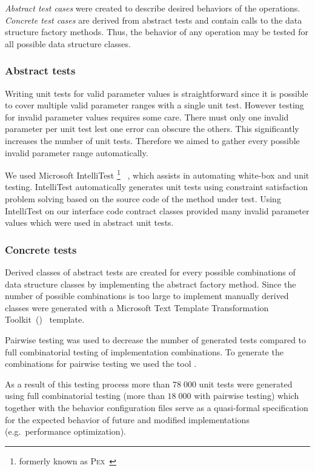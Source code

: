 \emph{Abstract test cases} were created to describe desired behaviors
of the operations. \emph{Concrete test cases} are derived from
abstract tests and contain calls to the data structure factory
methods. Thus, the behavior of any operation may be tested for all
possible data structure classes.

\subsubsection{Abstract tests}

Writing unit tests for valid parameter values is straightforward since
it is possible to cover multiple valid parameter ranges with a single
unit test. However testing for invalid parameter values requires some
care. There must only one invalid parameter per unit test lest one
error can obscure the others. This significantly increases the number
of unit tests. Therefore we aimed to gather every possible invalid
parameter range automatically.

We used Microsoft IntelliTest%
\footnote{formerly known as \textsc{Pex}~\citep{tillmann2008pex}}%
~\citep{IntelliTest}, which assists in automating white-box and unit
testing. IntelliTest automatically generates unit tests using
constraint satisfaction problem solving based on the source code of
the method under test. Using IntelliTest on our interface code
contract classes provided many invalid parameter values which were
used in abstract unit tests.

\subsubsection{Concrete tests}

Derived classes of abstract tests are created for every possible
combinations of data structure classes by implementing the abstract
factory method. Since the number of possible combinations is too large
to implement manually derived classes were generated with a Microsoft
Text Template Transformation Toolkit~()~\citep{T4}
template.

Pairwise testing was used to decrease the number of generated tests
compared to full combinatorial testing of implementation
combinations. To generate the combinations for pairwise testing we
used the  tool \citep{borazjany2012combinatorial}.

As a result of this testing process more than $78\;000$ unit tests
were generated using full combinatorial testing (more than $18\;000$
with pairwise testing) which together with the behavior configuration
files serve as a quasi-formal specification for the expected behavior
of future and modified implementations (e.g.~performance
optimization).

